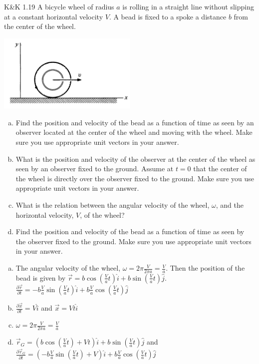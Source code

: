\documentclass{esg8012pset}
\begin{document}
\begin{problem}{K\&K 1.19}
  A bicycle wheel of radius $a$ is rolling in a straight line without slipping at a constant horizontal
  velocity $V$. A bead is fixed to a spoke a distance $b$ from the center of the wheel.
  \begin{center}\includegraphics[width=0.5\textwidth]{ps01_3}\end{center}
  \begin{enumerate}[a)]
    \item Find the position and velocity of the bead as a function of time as seen by an observer located
  at the center of the wheel and moving with the wheel. Make sure you use appropriate unit
  vectors in your answer.
    \item What is the position and velocity of the observer at the center of the wheel as seen by an
  observer fixed to the ground. Assume at $t = 0$ that the center of the wheel is directly over the
  observer fixed to the ground. Make sure you use appropriate unit vectors in your answer.
    \item What is the relation between the angular velocity of the wheel, $\omega$, and the horizontal velocity, $V$, of the wheel?
    \item Find the position and velocity of the bead as a function of time as seen by the observer fixed
  to the ground. Make sure you use appropriate unit vectors in your answer.
  \end{enumerate}
\end{problem}
\begin{solution}
  \begin{enumerate}[a)]
    \item The angular velocity of the wheel, $\omega = 2\pi \frac{V}{2\pi a} = \frac{V}{a}$.  Then the position of the bead is given by $\vec r = b\cos\left(\frac{V}{a}t\right)\hat i + b\sin\left(\frac{V}{a}t\right)\hat j$.  $\frac{\partial \vec r}{\partial t} = -b\frac{V}{a}\sin\left(\frac{V}{a}t\right)\hat i + b\frac{V}{a}\cos\left(\frac{V}{a}t\right)\hat j$
    \item $\frac{\partial \vec x}{\partial t} = V\hat i$ and $\vec x = V t\hat i$
    \item $\omega = 2\pi \frac{V}{2\pi a} = \frac{V}{a}$
    \item $\vec r_G = \left(b\cos\left(\frac{V}{a}t\right) + Vt\right)\hat i + b\sin\left(\frac{V}{a}t\right)\hat j$ and $\frac{\partial \vec r_G}{\partial t} = \left(-b\frac{V}{a}\sin\left(\frac{V}{a}t\right) + V\right)\hat i + b\frac{V}{a}\cos\left(\frac{V}{a}t\right)\hat j$
  \end{enumerate}
\end{solution}
\end{document}
